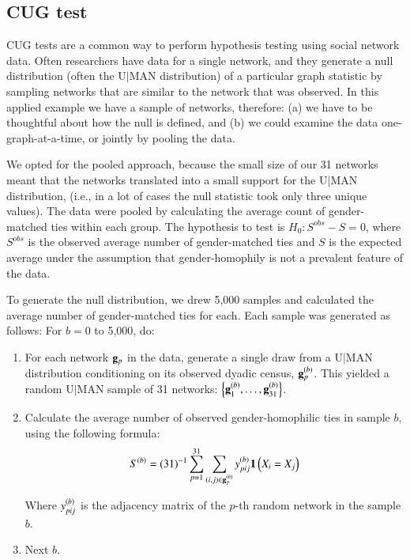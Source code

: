 \documentclass[review, nonatbib,doubleblind]{elsarticle/elsarticle}
\begin{document}
\subsection{CUG test}

CUG tests are a common way to perform hypothesis testing using social network data. Often researchers have data for a single network, and they generate a null distribution (often the U$|$MAN distribution) of a particular graph statistic by sampling networks that are similar to the network that was observed. In this applied example we have a sample of networks, therefore: (a) we have to be thoughtful about how the null is defined, and (b) we could examine the data one-graph-at-a-time, or jointly by pooling the data.

We opted for the pooled approach, because the small size of our 31 networks meant that the networks translated into a small support for the U$|$MAN distribution, (i.e., in a lot of cases the null statistic took only three unique values). The data were pooled by calculating the average count of gender-matched ties within each group. The hypothesis to test is $H_0: S^{obs} - S = 0$, where $S^{obs}$ is the observed average number of gender-matched ties and $S$ is the expected average under the assumption that gender-homophily is not a prevalent feature of the data. 

To generate the null distribution, we drew 5,000 samples and calculated the average number of gender-matched ties for each. Each sample was generated as follows: For $b = 0$ to 5,000, do:

\begin{enumerate}
    \item For each network $\mathbf{g}_p$ in the data, generate a single draw from a U$|$MAN distribution conditioning on its observed dyadic census, $\mathbf{g}_p^{(b)}$. This yielded a random U$|$MAN sample of 31 networks: $\left\{\mathbf{g}_1^{(b)}, \dots, \mathbf{g}_{31}^{(b)}\right\}$.
    \item Calculate the average number of observed gender-homophilic ties in sample $b$, using the following formula:
    \begin{equation*}
        S^{(b)} = (31)^{-1}\sum_{p=1}^{31}\sum_{(i, j) \in \mathbf{g}_p^{(b)}}y_{pij}^{(b)}{\boldsymbol{1}\left( X_{i} = X_{j} \right)}
    \end{equation*}
    
    Where $y_{pij}^{(b)}$ is the adjacency matrix of the $p$-th random network in the sample $b$.
    \item Next $b$.
\end{enumerate}
\end{document}
